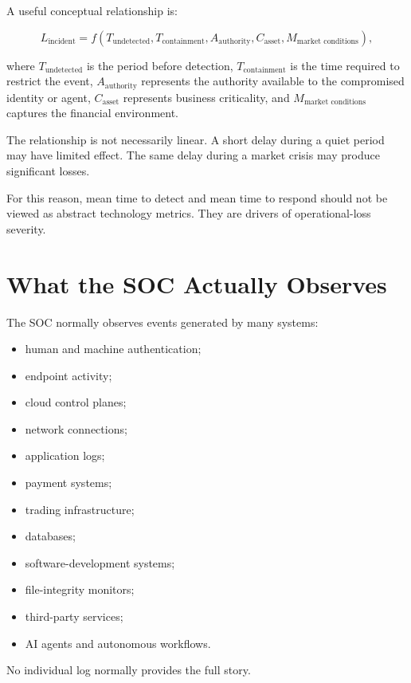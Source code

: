 A useful conceptual relationship is:

\begin{equation}
L_{\text{incident}}
=
f(
T_{\text{undetected}},
T_{\text{containment}},
A_{\text{authority}},
C_{\text{asset}},
M_{\text{market conditions}}
),
\end{equation}

where \(T_{\text{undetected}}\) is the period before detection, \(T_{\text{containment}}\) is the time required to restrict the event, \(A_{\text{authority}}\) represents the authority available to the compromised identity or agent, \(C_{\text{asset}}\) represents business criticality, and \(M_{\text{market conditions}}\) captures the financial environment.

The relationship is not necessarily linear. A short delay during a quiet period may have limited effect. The same delay during a market crisis may produce significant losses.

For this reason, mean time to detect and mean time to respond should not be viewed as abstract technology metrics. They are drivers of operational-loss severity.

\section{What the SOC Actually Observes}

The SOC normally observes events generated by many systems:

\begin{itemize}
    \item human and machine authentication;
    \item endpoint activity;
    \item cloud control planes;
    \item network connections;
    \item application logs;
    \item payment systems;
    \item trading infrastructure;
    \item databases;
    \item software-development systems;
    \item file-integrity monitors;
    \item third-party services;
    \item AI agents and autonomous workflows.
\end{itemize}

No individual log normally provides the full story.

